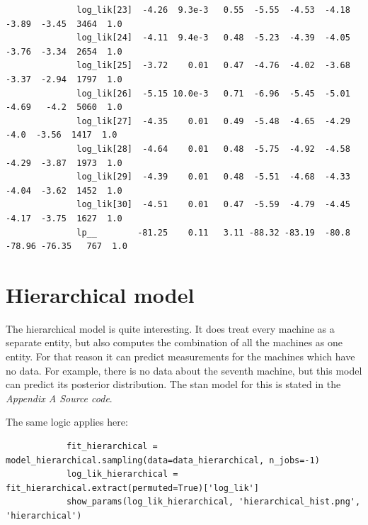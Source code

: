 \documentclass[11pt,a4paper,english]{article}
\begin{document}
\begin{itemize}
\begin{verbatim}
              log_lik[23]  -4.26  9.3e-3   0.55  -5.55  -4.53  -4.18  -3.89  -3.45  3464  1.0
              log_lik[24]  -4.11  9.4e-3   0.48  -5.23  -4.39  -4.05  -3.76  -3.34  2654  1.0
              log_lik[25]  -3.72    0.01   0.47  -4.76  -4.02  -3.68  -3.37  -2.94  1797  1.0
              log_lik[26]  -5.15 10.0e-3   0.71  -6.96  -5.45  -5.01  -4.69   -4.2  5060  1.0
              log_lik[27]  -4.35    0.01   0.49  -5.48  -4.65  -4.29   -4.0  -3.56  1417  1.0
              log_lik[28]  -4.64    0.01   0.48  -5.75  -4.92  -4.58  -4.29  -3.87  1973  1.0
              log_lik[29]  -4.39    0.01   0.48  -5.51  -4.68  -4.33  -4.04  -3.62  1452  1.0
              log_lik[30]  -4.51    0.01   0.47  -5.59  -4.79  -4.45  -4.17  -3.75  1627  1.0
              lp__        -81.25    0.11   3.11 -88.32 -83.19  -80.8 -78.96 -76.35   767  1.0
            \end{verbatim}
        \end{itemize}

      \section{Hierarchical model}
          The hierarchical model is quite interesting. It does treat every machine as a separate entity, but also computes the combination of all the machines as one entity. For that reason it can predict measurements for the machines which have no data. For example, there is no data about the seventh machine, but this model can predict its posterior distribution. The stan model for this is stated in the \textit{Appendix A Source code}.

          The same logic applies here:
          \begin{verbatim}
            fit_hierarchical = model_hierarchical.sampling(data=data_hierarchical, n_jobs=-1)
            log_lik_hierarchical = fit_hierarchical.extract(permuted=True)['log_lik']
            show_params(log_lik_hierarchical, 'hierarchical_hist.png', 'hierarchical')
          \end{verbatim}
\end{document}
